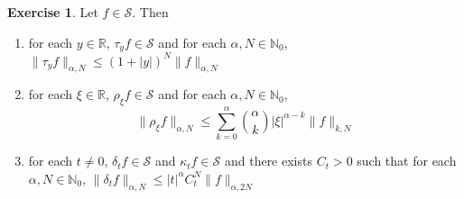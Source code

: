 \documentclass[12pt]{amsart}
\theoremstyle{definition}
\newtheorem{ex}[definition]{Exercise}
\newcommand{\al}{\alpha}
\newcommand{\del}{\delta}
\newcommand{\kap}{\kappa}
\newcommand{\N}{\mathbb{N}}
\newcommand{\R}{\mathbb{R}}
\newcommand{\MS}{\mathcal{S}}
\begin{document}
	\begin{ex}
		Let $f \in \MS$. Then 
		\begin{enumerate}
			\item for each $y \in \R$, $\tau_y f \in \MS$ and for each $\al, N \in \N_0$, $\|\tau_yf\|_{\al, N} \leq (1 + |y|)^N \|f\|_{\al, N}$
			\item for each $\xi \in \R$, $\rho_{\xi} f \in \MS$ and for each $\al,N \in \N_0$, $$\|\rho_{\xi} f\|_{\al,N} \leq \sum\limits_{k=0}^{\al} {\al \choose k} |\xi|^{\al-k} \|f\|_{k, N}$$
			\item for each $t \neq 0$, $\del_t f \in \MS$ and $\kap_tf \in \MS$ and there exists $C_t > 0$ such that for each $\al,N \in \N_0$, $\|\del_t f\|_{\al, N} \leq |t|^{\al} C_t^N\|f\|_{\al, 2N}$
		\end{enumerate}
	\end{ex}
\end{document}
